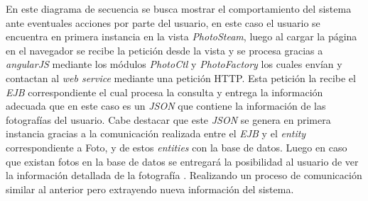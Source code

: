 \documentclass{memoria}
\begin{document}

En este diagrama de secuencia se busca mostrar el comportamiento del sistema ante eventuales acciones por parte del usuario, en este caso el usuario se encuentra en primera instancia en la vista \textsl{PhotoSteam}, luego al cargar la página en el navegador se recibe la petición desde la vista y se procesa gracias a \textsl{angularJS} mediante los módulos \textsl{PhotoCtl} y \textsl{PhotoFactory} los cuales envían y contactan al \textsl{web service} mediante una petición HTTP. Esta petición la recibe el \textsl{EJB} correspondiente el cual procesa la consulta y entrega la información adecuada que en este caso es  un \textsl{JSON} que contiene la información de las fotografías del usuario. Cabe destacar que este \textsl{JSON} se genera en primera instancia gracias a la comunicación realizada entre el \textsl{EJB} y el \textsl{entity} correspondiente a Foto, y de estos \textsl{entities} con la base de datos.  Luego en caso que existan fotos en la base de datos se entregará la posibilidad al usuario de ver la información detallada de la fotografía . Realizando un proceso de comunicación similar al anterior pero extrayendo nueva información del sistema.


\end{document}
